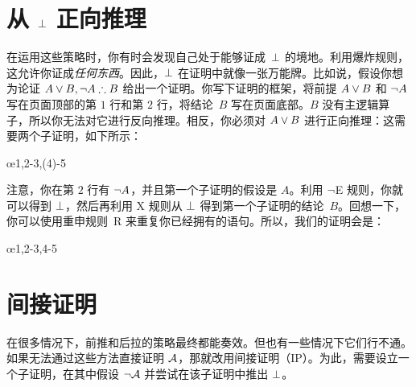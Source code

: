 \begin{fitchproof}
	\open
	\AS
	\open
	\AS
	\open{}
	\close
	\close
	\close
\end{fitchproof}

\section{从 $\bot$ 正向推理}\label{sec:backred}

在运用这些策略时，你有时会发现自己处于能够证成~$\bot$ 的境地。利用爆炸规则，这允许你证成\emph{任何东西}。因此，$\bot$ 在证明中就像一张万能牌。比如说，假设你想为论证 $A \eor B, \enot A \therefore B$ 给出一个证明。你写下证明的框架，将前提 $A \vee B$ 和 $\neg A$ 写在页面顶部的第 $1$ 行和第 $2$ 行，将结论~$B$ 写在页面底部。$B$ 没有主逻辑算子，所以你无法对它进行反向推理。相反，你必须对 $A \vee B$ 进行正向推理：这需要两个子证明，如下所示：


\begin{fitchproof}
	\PR
	\PR
	\open
	 \AS
	\ellipsesline
	\close
	\open
	\AS
	\ellipsesline
	\close
	\oe{1,2-3,(4)-5}
\end{fitchproof}


注意，你在第 $2$ 行有 $\neg A$，并且第一个子证明的假设是 $A$。利用 $\neg$E 规则，你就可以得到 $\bot$，然后再利用 X 规则从 $\bot$ 得到第一个子证明的结论~$B$。回想一下，你可以使用重申规则~R 来重复你已经拥有的语句。所以，我们的证明会是：


\begin{fitchproof}
	\PR
	\PR
	\open
	 \AS
	\close
	\open
	\AS
	\close
	\oe{1,2-3,4-5}
\end{fitchproof}

\section{间接证明}

在很多情况下，前推和后拉的策略最终都能奏效。但也有一些情况下它们行不通。如果无法通过这些方法直接证明 $\mathcal{A}$，那就改用间接证明（IP）。为此，需要设立一个子证明，在其中假设 $\neg\mathcal{A}$ 并尝试在该子证明中推出 $\bot$。

